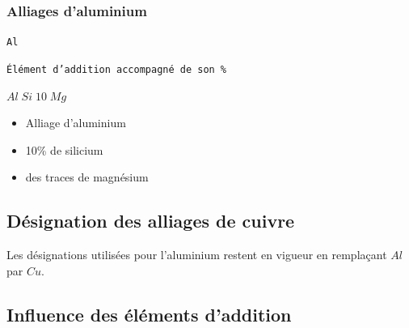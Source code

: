 \documentclass[11pt,oneside]{article}
\begin{document}
\subsubsection{Alliages d'aluminium}

\begin{resultat}

\begin{minipage}[c]{.3\linewidth}
\begin{center}
\texttt{Al}
\end{center}
\end{minipage} \hfill
\begin{minipage}[c]{.3\linewidth}
\begin{center}
\texttt{Élément d'addition accompagné de son \%}
\end{center}
\end{minipage} 

\end{resultat}


\begin{exemple}
\begin{minipage}[c]{.3\linewidth}
\begin{center}
$Al\; Si\; 10\; Mg$
\end{center}
\end{minipage} \hfill
\begin{minipage}[c]{.6\linewidth}
\begin{itemize}
\item Alliage d'aluminium
\item 10\% de silicium
\item des traces de magnésium
\end{itemize}
\end{minipage}

\end{exemple}




\subsection{Désignation des alliages de cuivre}
Les désignations utilisées pour l'aluminium restent en vigueur en remplaçant $Al$ par $Cu$.


\subsection{Influence des éléments d'addition}
\end{document}
